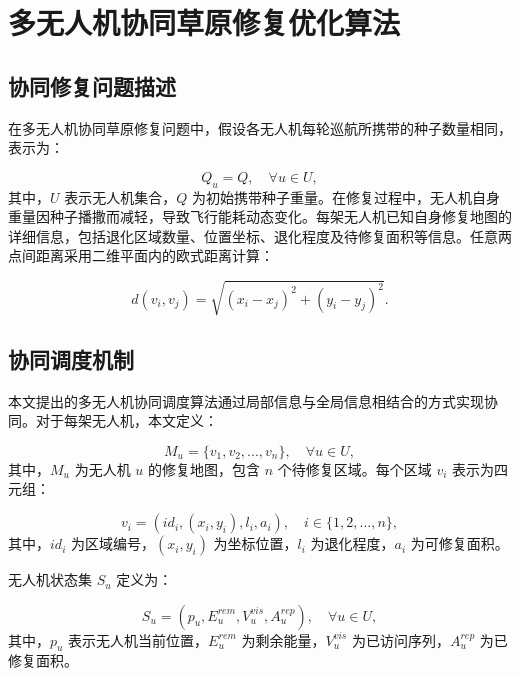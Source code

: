 \chapter{多无人机协同草原修复优化算法}

\section{协同修复问题描述}

在多无人机协同草原修复问题中，假设各无人机每轮巡航所携带的种子数量相同，表示为：

\begin{equation}
	Q_u = Q, \quad \forall u \in U,
\end{equation}
其中，$U$ 表示无人机集合，$Q$ 为初始携带种子重量。在修复过程中，无人机自身重量因种子播撒而减轻，导致飞行能耗动态变化。每架无人机已知自身修复地图的详细信息，包括退化区域数量、位置坐标、退化程度及待修复面积等信息。任意两点间距离采用二维平面内的欧式距离计算：

\begin{equation}
	d(v_i, v_j) = \sqrt{(x_i - x_j)^2 + (y_i - y_j)^2}.
\end{equation}

\section{协同调度机制}

本文提出的多无人机协同调度算法通过局部信息与全局信息相结合的方式实现协同。对于每架无人机，本文定义：

\begin{equation}
	M_u = \{v_1, v_2, ..., v_n\}, \quad \forall u \in U,
\end{equation}
其中，$M_u$ 为无人机 $u$ 的修复地图，包含 $n$ 个待修复区域。每个区域 $v_i$ 表示为四元组：

\begin{equation}
	v_i = (id_i, (x_i, y_i), l_i, a_i), \quad i \in \{1,2,...,n\},
\end{equation}
其中，$id_i$ 为区域编号，$(x_i, y_i)$ 为坐标位置，$l_i$ 为退化程度，$a_i$ 为可修复面积。

无人机状态集 $S_u$ 定义为：

\begin{equation}
	S_u = (p_u, E_u^{rem}, V_u^{vis}, A_u^{rep}), \quad \forall u \in U,
\end{equation}
其中，$p_u$ 表示无人机当前位置，$E_u^{rem}$ 为剩余能量，$V_u^{vis}$ 为已访问序列，$A_u^{rep}$ 为已修复面积。

